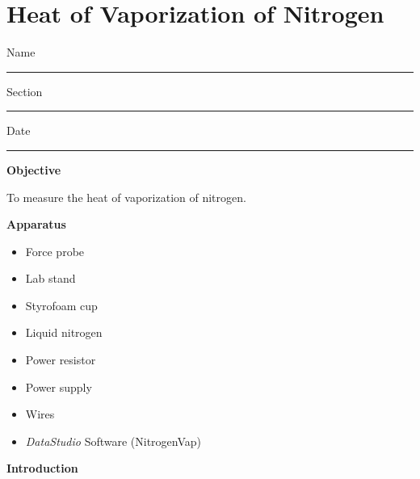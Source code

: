 
\section{Heat of Vaporization of Nitrogen}

Name \rule{2.0in}{0.1pt}\hfill{}Section \rule{1.0in}{0.1pt}\hfill{}Date
\rule{1.0in}{0.1pt}

\textbf{Objective}

To measure the heat of vaporization of nitrogen.

\textbf{Apparatus}

\begin{itemize}
\item Force probe
\item Lab stand
\item Styrofoam cup
\item Liquid nitrogen
\item Power resistor
\item Power supply
\item Wires
\item \textit{DataStudio} Software (NitrogenVap)
\end{itemize}
\vspace{0.3cm}
{\centering {} \par}
\vspace{0.3cm}

\textbf{Introduction}

